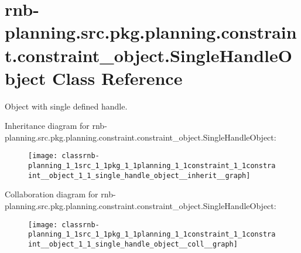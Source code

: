 \hypertarget{classrnb-planning_1_1src_1_1pkg_1_1planning_1_1constraint_1_1constraint__object_1_1_single_handle_object}{}\section{rnb-\/planning.src.\+pkg.\+planning.\+constraint.\+constraint\+\_\+object.\+Single\+Handle\+Object Class Reference}
\label{classrnb-planning_1_1src_1_1pkg_1_1planning_1_1constraint_1_1constraint__object_1_1_single_handle_object}


Object with single defined handle.  




Inheritance diagram for rnb-\/planning.src.\+pkg.\+planning.\+constraint.\+constraint\+\_\+object.\+Single\+Handle\+Object\+:\nopagebreak
\begin{figure}[H]
\begin{center}
\leavevmode
\texttt{[image: classrnb-planning\_1\_1src\_1\_1pkg\_1\_1planning\_1\_1constraint\_1\_1constraint\_\_object\_1\_1\_single\_handle\_object\_\_inherit\_\_graph]}
\end{center}
\end{figure}


Collaboration diagram for rnb-\/planning.src.\+pkg.\+planning.\+constraint.\+constraint\+\_\+object.\+Single\+Handle\+Object\+:\nopagebreak
\begin{figure}[H]
\begin{center}
\leavevmode
\texttt{[image: classrnb-planning\_1\_1src\_1\_1pkg\_1\_1planning\_1\_1constraint\_1\_1constraint\_\_object\_1\_1\_single\_handle\_object\_\_coll\_\_graph]}
\end{center}
\end{figure}
